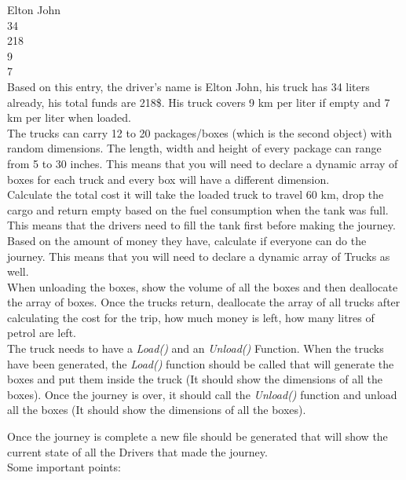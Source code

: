 \documentclass[a4paper,12pt]{article}
\begin{document}
	\noindent Elton John\\
	34\\
	218\\
	9\\
	7\\
	
	\noindent Based on this entry, the driver’s name is Elton John, his truck has 34 liters already, his total funds are
	218\$. His truck covers 9 km per liter if empty and 7 km per liter when loaded.\\
	
	\noindent The trucks can carry 12 to 20 packages/boxes (which is the second object) with random dimensions. The length, width and height of every package can range from 5 to 30 inches. This means that you will need to declare a dynamic array of boxes for each truck and every box will have a different dimension.\smallskip\\
	
	\noindent Calculate the total cost it will take the loaded truck to travel 60 km, drop the cargo and return empty based on the fuel consumption when the tank was full. This means that the drivers need to fill the tank	first before making the journey. Based on the amount of money they have, calculate if everyone can do	the journey. This means that you will need to declare a dynamic array of Trucks as well.\smallskip\\
	
	\noindent When unloading the boxes, show the volume of all the boxes and then deallocate the array of boxes. Once the trucks return, deallocate the array of all trucks after calculating the cost for the trip, how much money is left, how many litres of petrol are left.\smallskip\\
	
	\noindent The truck needs to have a \textit{Load()} and an \textit{Unload()} Function. When the trucks have been generated, the \textit{Load()} function should be called that will generate the boxes and put them inside the truck (It should show the dimensions of all the boxes). Once the journey is over, it should call the \textit{Unload()} function and unload all the boxes (It should show the dimensions of all the boxes).
	
	\noindent Once the journey is complete a new file  should be generated that will show the current state of all the Drivers that made the journey.\smallskip\\
	
	\noindent Some important points:
	
\end{document}
